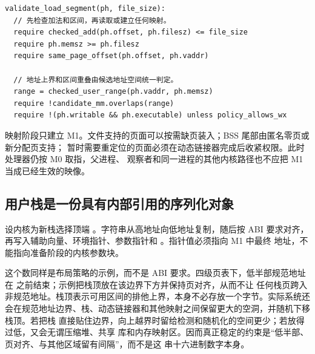 \begin{lstlisting}
validate_load_segment(ph, file_size):
  // 先检查加法和区间，再读取或建立任何映射。
  require checked_add(ph.offset, ph.filesz) <= file_size
  require ph.memsz >= ph.filesz
  require same_page_offset(ph.offset, ph.vaddr)

  // 地址上界和区间重叠由候选地址空间统一判定。
  range = checked_user_range(ph.vaddr, ph.memsz)
  require !candidate_mm.overlaps(range)
  require !(ph.writable && ph.executable) unless policy_allows_wx
\end{lstlisting}

映射阶段只建立 M1。文件支持的页面可以按需缺页装入；BSS 尾部由匿名零页或新分配页支持；
暂时需要重定位的页面必须在动态链接器完成后收紧权限。此时处理器仍按 M0 取指，父进程、
 观察者和同一进程的其他内核路径也不应把 M1 当成已经生效的映像。

\subsection{用户栈是一份具有内部引用的序列化对象}

设内核为新栈选择顶端 。字符串从高地址向低地址复制，随后按 ABI
要求对齐，再写入辅助向量、环境指针、参数指针和 。指针值必须指向 M1 中最终
地址，不能指向准备阶段的内核参数块。

这个数同样是布局策略的示例，而不是 ABI 要求。四级页表下，低半部规范地址在
 之前结束；示例把栈顶放在该边界下方并保持页对齐，从而不让
任何栈页跨入非规范地址。栈顶表示可用区间的排他上界，本身不必存放一个字节。实际系统还
会在规范地址边界、栈、动态链接器和其他映射之间保留更大的空洞，并随机下移栈顶。若把栈
直接贴住边界，向上越界时留给检测和随机化的空间更少；若放得过低，又会无谓压缩堆、共享
库和内存映射区。因而真正稳定的约束是“低半部、页对齐、与其他区域留有间隔”，而不是这
串十六进制数字本身。


